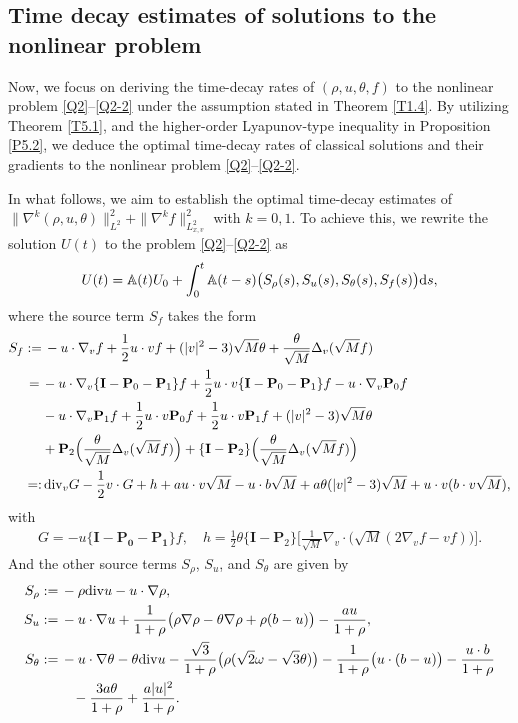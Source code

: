 \documentclass[reqno,11pt]{amsart}
\theoremstyle{plain}
\numberwithin{equation}{section}
\begin{document}
\subsection{Time   decay estimates of  solutions to the nonlinear problem}
Now, we focus on deriving the time-decay rates of $(\rho, u, \theta, f)$ to the nonlinear problem  \eqref{Q2}--\eqref{Q2-2} under the assumption stated in Theorem \ref{T1.4}.   By utilizing Theorem \ref{T5.1},
and the higher-order Lyapunov-type inequality in Proposition \ref{P5.2},
we deduce the optimal time-decay rates of classical solutions and their
gradients to the nonlinear problem \eqref{Q2}--\eqref{Q2-2}.

In what follows, we aim to establish the optimal time-decay estimates of $\|\nabla^k(\rho,u,\theta)\|_{L^2}^{2} +\|\nabla^k f\|_{L_{x,v}^2}^2$ with $k=0, 1 $. To achieve this, we rewrite the solution $U(t)$ to the problem  \eqref{Q2}--\eqref{Q2-2} as   
\begin{align}\label{G5.54}  
U(t)=\mathbb{A}(t)U_{0}+\int_{0}^{t}\mathbb{A}(t-s)\big( S_\rho(s),S_u(s), S_\theta(s), S_f(s)\big) {\rm d}s,
\end{align}  
where the  source term $S_f$ takes the form  
\begin{align*}  
S_f := &\,  -u\cdot\nabla_vf+\frac{1}{2}u\cdot vf + (|v|^2-3)\sqrt{M}\theta+ \frac{\theta}{\sqrt{M}}\Delta_v(\sqrt{M}f)\nonumber\\
=\,&-u\cdot\nabla_v\{\mathbf{I}-\mathbf{P}_0-\mathbf{P}_1\}f+\frac{1}{2} u\cdot v\{\mathbf{I}-\mathbf{P}_0-\mathbf{P}_1\}f- u\cdot\nabla_v  \mathbf{P}_0 f\nonumber\\
&-u\cdot\nabla_v \mathbf{P}_1 f+ \frac{1}{2}u\cdot v \mathbf{P}_0 f+\frac{1}{2}u\cdot v \mathbf{P}_1 f+ (|v|^2-3)\sqrt{M}\theta\nonumber\\ &+\mathbf{P}_2\Big(\frac{\theta}{\sqrt{M}}\Delta_v(\sqrt{M}f)\Big)
+\{\mathbf{I}-\mathbf{P}_2\}\Big(\frac{\theta}{\sqrt{M}}\Delta_v(\sqrt{M}f)\Big)\nonumber\\
=:&\, {\rm div}_v G-\frac{1}{2}v\cdot G+h+au\cdot v\sqrt{M}-u\cdot b\sqrt{M}+a\theta(|v|^2-3)\sqrt{M}+u\cdot v(b\cdot v\sqrt{M}),
\end{align*}
with  
\begin{align*}  
G = -u \{\mathbf{I} - \mathbf{P}_{\mathbf{0}} - \mathbf{P}_{\mathbf{1}}\} f, \quad h = \frac{1}{2} \theta \{\mathbf{I} - \mathbf{P}_2\} \Big[\frac{1}{\sqrt{M}} \nabla_v \cdot \big(\sqrt{M} (2 \nabla_v f - v f)\big)\Big].  
\end{align*}  
And the other source terms $S_\rho$, $S_u$, and $S_\theta$ are given by 
\begin{align*}  
S_\rho :=&\, -\rho {\rm div} u - u \cdot \nabla \rho, \\  
S_u :=&\, -u \cdot \nabla u + \frac{1}{1+\rho} \big(\rho \nabla \rho - \theta \nabla \rho + \rho (b-u)\big) - \frac{a u}{1+\rho}, \\  
S_\theta :=&\, -u \cdot \nabla \theta - \theta {\rm div} u - \frac{\sqrt{3}}{1+\rho} \big(\rho (\sqrt{2} \omega - \sqrt{3} \theta)\big) - \frac{1}{1+\rho} \big(u \cdot (b-u)\big)- \frac{u \cdot b}{1+\rho} \\  
&\quad  - \frac{3a \theta}{1+\rho}+ \frac{a |u|^2 }{1+\rho}  .  
\end{align*} 
 
\end{document}
